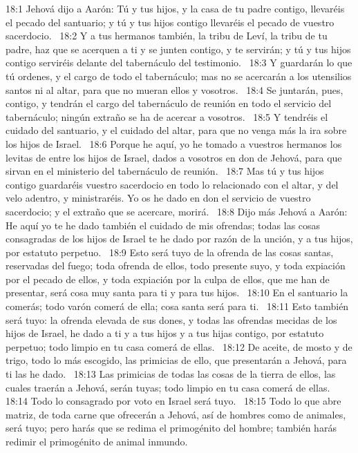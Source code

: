 18:1 Jehová dijo a Aarón: Tú y tus hijos, y la casa de tu padre contigo, llevaréis el pecado del santuario; y tú y tus hijos contigo llevaréis el pecado de vuestro sacerdocio.  
18:2 Y a tus hermanos también, la tribu de Leví, la tribu de tu padre, haz que se acerquen a ti y se junten contigo, y te servirán; y tú y tus hijos contigo serviréis delante del tabernáculo del testimonio.  
18:3 Y guardarán lo que tú ordenes, y el cargo de todo el tabernáculo; mas no se acercarán a los utensilios santos ni al altar, para que no mueran ellos y vosotros.  
18:4 Se juntarán, pues, contigo, y tendrán el cargo del tabernáculo de reunión en todo el servicio del tabernáculo; ningún extraño se ha de acercar a vosotros.  
18:5 Y tendréis el cuidado del santuario, y el cuidado del altar, para que no venga más la ira sobre los hijos de Israel.  
18:6 Porque he aquí, yo he tomado a vuestros hermanos los levitas de entre los hijos de Israel, dados a vosotros en don de Jehová, para que sirvan en el ministerio del tabernáculo de reunión.  
18:7 Mas tú y tus hijos contigo guardaréis vuestro sacerdocio en todo lo relacionado con el altar, y del velo adentro, y ministraréis. Yo os he dado en don el servicio de vuestro sacerdocio; y el extraño que se acercare, morirá.  
18:8 Dijo más Jehová a Aarón: He aquí yo te he dado también el cuidado de mis ofrendas; todas las cosas consagradas de los hijos de Israel te he dado por razón de la unción, y a tus hijos, por estatuto perpetuo.  
18:9 Esto será tuyo de la ofrenda de las cosas santas, reservadas del fuego; toda ofrenda de ellos, todo presente suyo, y toda expiación por el pecado de ellos, y toda expiación por la culpa de ellos, que me han de presentar, será cosa muy santa para ti y para tus hijos.  
18:10 En el santuario la comerás; todo varón comerá de ella; cosa santa será para ti.  
18:11 Esto también será tuyo: la ofrenda elevada de sus dones, y todas las ofrendas mecidas de los hijos de Israel, he dado a ti y a tus hijos y a tus hijas contigo, por estatuto perpetuo; todo limpio en tu casa comerá de ellas.  
18:12 De aceite, de mosto y de trigo, todo lo más escogido, las primicias de ello, que presentarán a Jehová, para ti las he dado.  
18:13 Las primicias de todas las cosas de la tierra de ellos, las cuales traerán a Jehová, serán tuyas; todo limpio en tu casa comerá de ellas.  
18:14 Todo lo consagrado por voto en Israel será tuyo.  
18:15 Todo lo que abre matriz, de toda carne que ofrecerán a Jehová, así de hombres como de animales, será tuyo; pero harás que se redima el primogénito del hombre; también harás redimir el primogénito de animal inmundo.  
